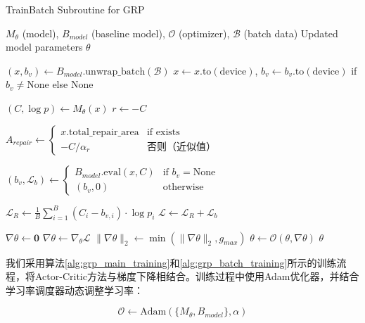 \documentclass[AutoFakeBold]{LZUThesis}
\begin{document}
\begin{algorithm}[H]
	\begin{algorithmic}[1]
		\caption{TrainBatch Subroutine for GRP}
		\label{alg:grp_batch_training}
		\Require $M_{\theta}$ (model), $B_{model}$ (baseline model), $\mathcal{O}$ (optimizer), $\mathcal{B}$ (batch data)
		\Ensure Updated model parameters $\theta$

		\State $(x, b_v) \leftarrow B_{model}.\text{unwrap\_batch}(\mathcal{B})$
		\State $x \leftarrow x.\text{to}(\text{device})$, $b_v \leftarrow b_v.\text{to}(\text{device})$ if $b_v \neq \text{None}$ else $\text{None}$

		\State $(C, \log p) \leftarrow M_{\theta}(x)$ 
		\State $r \leftarrow -C$ 

		\State $A_{repair} \leftarrow \begin{cases}
				x.\text{total\_repair\_area} & \text{if exists}                 \\
				-C / \alpha_{r}              & \text{否则（近似值）}
			\end{cases}$
		\EndIf

		\State $(b_v, \mathcal{L}_{b}) \leftarrow \begin{cases}
				B_{model}.\text{eval}(x, C) & \text{if } b_v = \text{None} \\
				(b_v, 0)                    & \text{otherwise}
			\end{cases}$

		\State $\mathcal{L}_{R} \leftarrow \frac{1}{B}\sum_{i=1}^{B}(C_i - b_{v,i}) \cdot \log p_i$
		\State $\mathcal{L} \leftarrow \mathcal{L}_{R} + \mathcal{L}_{b}$ 

		\State $\nabla\theta \leftarrow \mathbf{0}$ 
		\State $\nabla\theta \leftarrow \nabla_{\theta}\mathcal{L}$ 
		\State $\|\nabla\theta\|_2 \leftarrow \min(\|\nabla\theta\|_2, g_{max})$ 
		\State $\theta \leftarrow \mathcal{O}(\theta, \nabla\theta)$ 
		\State \Return $\theta$
	\end{algorithmic}
\end{algorithm}

我们采用算法\ref{alg:grp_main_training}和\ref{alg:grp_batch_training}所示的训练流程，将Actor-Critic方法与梯度下降相结合。训练过程中使用Adam优化器，并结合学习率调度器动态调整学习率：

\begin{equation}
	\mathcal{O} \leftarrow \text{Adam}(\{M_{\theta}, B_{model}\}, \alpha)
\end{equation}
\end{document}
